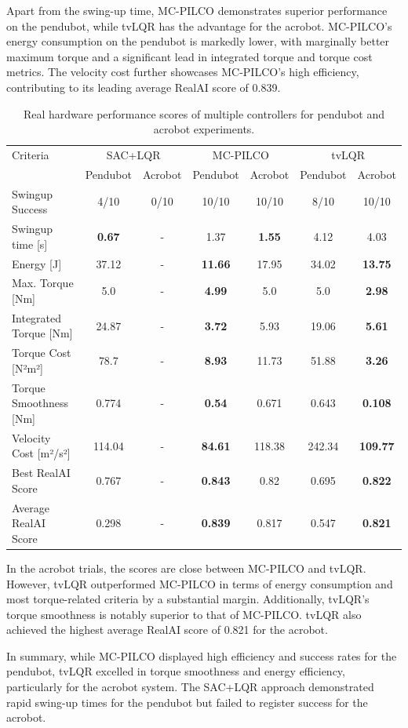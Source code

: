 Apart from the swing-up time, MC-PILCO demonstrates superior performance on the pendubot, while tvLQR has the advantage for the acrobot. MC-PILCO's energy consumption on the pendubot is markedly lower, with marginally better maximum torque and a significant lead in integrated torque and torque cost metrics. The velocity cost further showcases MC-PILCO's high efficiency, contributing to its leading average RealAI score of 0.839.

\begin{table}[H]
  \centering
 \begin{tabular}{lcccccc}
 \hline
 Criteria & \multicolumn{2}{c}{SAC+LQR} & \multicolumn{2}{c}{MC-PILCO} & \multicolumn{2}{c}{tvLQR} \\
 & Pendubot & Acrobot & Pendubot & Acrobot & Pendubot & Acrobot \\
 \hline
 Swingup Success & 4/10 & 0/10 & 10/10 & 10/10 & 8/10 & 10/10 \\
 Swingup time [s] & \textbf{0.67} & - & 1.37 & \textbf{1.55} & 4.12 & 4.03 \\
 Energy [J] & 37.12 & - & \textbf{11.66} & 17.95 & 34.02 & \textbf{13.75} \\
 Max. Torque [Nm] & 5.0 & - & \textbf{4.99} & 5.0 & 5.0 & \textbf{2.98} \\
 Integrated Torque [Nm] & 24.87 & - & \textbf{3.72} & 5.93 & 19.06 & \textbf{5.61} \\
 Torque Cost [N²m²] & 78.7 & - & \textbf{8.93} & 11.73 & 51.88 & \textbf{3.26} \\
 Torque Smoothness [Nm] & 0.774 & - & \textbf{0.54} & 0.671 & 0.643 & \textbf{0.108} \\
 Velocity Cost [m²/s²] & 114.04 & - & \textbf{84.61} & 118.38 & 242.34 & \textbf{109.77} \\
 Best RealAI Score & 0.767 & - & \textbf{0.843} & 0.82 & 0.695 & \textbf{0.822} \\
 Average RealAI Score & 0.298 & - & \textbf{0.839} & 0.817 & 0.547 & \textbf{0.821} \\
 \hline
 \end{tabular}
 \caption{Real hardware performance scores of multiple controllers for pendubot and acrobot experiments.}
 \label{tab:performance_real}
\end{table}

In the acrobot trials, the scores are close between MC-PILCO and tvLQR. However, tvLQR outperformed MC-PILCO in terms of energy consumption and most torque-related criteria by a substantial margin. Additionally, tvLQR's torque smoothness is notably superior to that of MC-PILCO. tvLQR also achieved the highest average RealAI score of 0.821 for the acrobot.

In summary, while MC-PILCO displayed high efficiency and success rates for the pendubot, tvLQR excelled in torque smoothness and energy efficiency, particularly for the acrobot system. The SAC+LQR approach demonstrated rapid swing-up times for the pendubot but failed to register success for the acrobot.

\cleardoublepage
